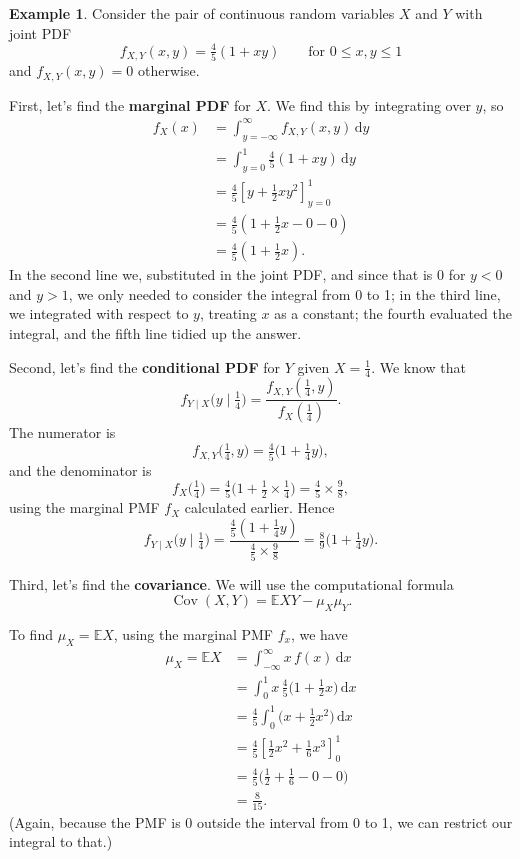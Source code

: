 \documentclass[
  a4paper,
]{book}
\theoremstyle{definition}
\theoremstyle{definition}
\newtheorem{example}{Example}[chapter]
\theoremstyle{definition}
\theoremstyle{definition}
\theoremstyle{remark}
\begin{document}
\begin{example}
Consider the pair of continuous random variables \(X\) and \(Y\) with joint PDF
\[ f_{X,Y}(x,y) = \tfrac45(1 + xy) \qquad \text{for $0 \leq x,y\leq 1$} \]
and \(f_{X,Y}(x,y) = 0\) otherwise.

First, let's find the \textbf{marginal PDF} for \(X\). We find this by integrating over \(y\), so
\begin{align*}
f_X(x) &= \int_{y=-\infty}^\infty f_{X,Y}(x,y) \, \mathrm{d}y \\
  &= \int_{y = 0}^1 \tfrac45 (1 + xy) \, \mathrm dy \\
  &= \tfrac45 \left[y + \tfrac12 xy^2 \right]_{y=0}^1 \\
  &= \tfrac45 \left(1 + \tfrac12x - 0 - 0 \right) \\
  &= \tfrac45 \left(1 + \tfrac12x \right) . 
\end{align*}
In the second line we, substituted in the joint PDF, and since that is 0 for \(y<0\) and \(y>1\), we only needed to consider the integral from 0 to 1; in the third line, we integrated with respect to \(y\), treating \(x\) as a constant; the fourth evaluated the integral, and the fifth line tidied up the answer.

Second, let's find the \textbf{conditional PDF} for \(Y\) given \(X = \frac14\). We know that
\[ f_{Y\mid X} \big(y \mid \tfrac14\big) = \frac{f_{X, Y} (\tfrac14, y)}{f_X(\frac14)} .  \]
The numerator is
\[ f_{X, Y} \big(\tfrac14, y\big) = \tfrac45 \big(1 + \tfrac14y\big) , \]
and the denominator is
\[ f_X\big(\tfrac14\big) = \tfrac 45 \big(1 + \tfrac12\times \tfrac 14\big) = \tfrac45 \times \tfrac 98 , \]
using the marginal PMF \(f_X\) calculated earlier. Hence
\[ f_{Y\mid X} \big(y \mid \tfrac14\big) =  \frac{\tfrac45 (1 + \tfrac14y)}{\tfrac45 \times \tfrac 98} = \tfrac89 \big(1 + \tfrac14y\big) . \]

Third, let's find the \textbf{covariance}. We will use the computational formula
\[ \operatorname{Cov}(X, Y) = \mathbb EXY - \mu_X \mu_Y . \]

To find \(\mu_X = \mathbb EX\), using the marginal PMF \(f_x\), we have
\begin{align*}
\mu_X = \mathbb EX &= \int_{-\infty}^{\infty} x\,f(x)\, \mathrm dx \\
  &= \int_0^1 x \, \tfrac45 \big(1 + \tfrac12 x\big)\,\mathrm dx \\
  &= \tfrac45 \int_0^1 \big(x + \tfrac12 x^2 \big) \, \mathrm dx \\
  &= \tfrac45 \left[ \tfrac12x^2 + \tfrac16 x^3 \right]_0^1 \\
  &= \tfrac45 \big(\tfrac12 + \tfrac16 - 0 - 0 \big) \\
  &= \tfrac{8}{15}.
\end{align*}
(Again, because the PMF is 0 outside the interval from 0 to 1, we can restrict our integral to that.)


\end{example}
\end{document}

